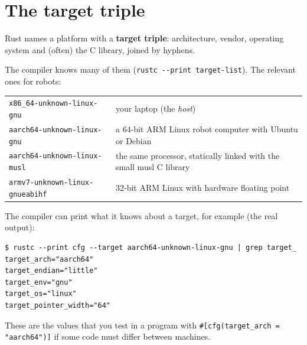 \section*{The target triple}
Rust names a platform with a \textbf{target triple}: architecture, vendor, operating system and (often) the C library, joined by hyphens.
\begin{center}
\end{center}
The compiler knows many of them (\verb!rustc --print target-list!). The relevant ones for robots:
\begin{center}
\renewcommand{\arraystretch}{1.2}
\begin{tabular}{lp{7.2cm}}
\verb!x86_64-unknown-linux-gnu! & your laptop (the \emph{host})\\
\verb!aarch64-unknown-linux-gnu! & a 64-bit ARM Linux robot computer with Ubuntu or Debian\\
\verb!aarch64-unknown-linux-musl! & the same processor, statically linked with the small musl C library\\
\verb!armv7-unknown-linux-gnueabihf! & 32-bit ARM Linux with hardware floating point\\
\end{tabular}
\end{center}
The compiler can print what it knows about a target, for example (the real output):
\begin{verbatim}
$ rustc --print cfg --target aarch64-unknown-linux-gnu | grep target_
target_arch="aarch64"
target_endian="little"
target_env="gnu"
target_os="linux"
target_pointer_width="64"
\end{verbatim}
These are the values that you test in a program with \verb!#[cfg(target_arch = "aarch64")]! if some code must differ between machines.

